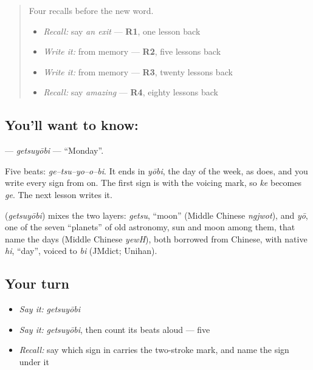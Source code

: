 \begin{quote}
Four recalls before the new word.

\begin{itemize}
\raggedright
  \item \emph{Recall:} say \emph{an exit} — \textbf{R1}, one lesson back
  \item \emph{Write it:} \textbf{} from memory — \textbf{R2}, five lessons back
  \item \emph{Write it:} \textbf{} from memory — \textbf{R3}, twenty lessons back
  \item \emph{Recall:} say \emph{amazing} — \textbf{R4}, eighty lessons back
\end{itemize}
\end{quote}

\subsection*{You'll want to know: }
\textbf{} — \emph{getsuyōbi} — \textquotedblleft{}Monday\textquotedblright{}.

Five beats: \emph{ge–tsu–yo–o–bi}. It ends in \emph{yōbi}, the day of the week, as \textbf{} does, and you write every sign from \textbf{} on. The first sign is \textbf{} with the voicing mark, so \emph{ke} becomes \emph{ge}. The next lesson writes it.

\begin{cousinweb}
\textbf{} (\emph{getsuyōbi}) mixes the two layers: \emph{getsu}, \textquotedblleft{}moon\textquotedblright{} (Middle Chinese \emph{ngjwot}), and \emph{yō}, one of the seven \textquotedblleft{}planets\textquotedblright{} of old astronomy, sun and moon among them, that name the days (Middle Chinese \emph{yewH}), both borrowed from Chinese, with native \emph{hi}, \textquotedblleft{}day\textquotedblright{}, voiced to \emph{bi} (JMdict; Unihan).
\end{cousinweb}

\subsection*{Your turn}
\begin{itemize}
\raggedright
  \item \emph{Say it:} \emph{getsuyōbi}
  \item \emph{Say it:} \emph{getsuyōbi}, then count its beats aloud — five
  \item \emph{Recall:} say which sign in \textbf{} carries the two-stroke mark, and name the sign under it
\end{itemize}

